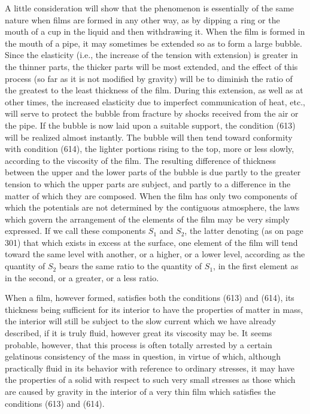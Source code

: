 \documentclass[12pt]{article}
\begin{document}
A little consideration will show that the phenomenon is essentially of the same nature when films are formed in any other way, as by dipping a ring or the mouth of a cup in the liquid and then withdrawing it. When the film is formed in the mouth of a pipe, it may sometimes be extended so as to form a large bubble. Since the elasticity (i.e., the increase of the tension with extension) is greater in the thinner parts, the thicker parts will be most extended, and the effect of this process (so far as it is not modified by gravity) will be to diminish the ratio of the greatest to the least thickness of the film. During this extension, as well as at other times, the increased elasticity due to imperfect communication of heat, etc., will serve to protect the bubble from fracture by shocks received from the air or the pipe. If the bubble is now laid upon a suitable support, the condition (613) will be realized almost instantly. The bubble will then tend toward conformity with condition (614), the lighter portions rising to the top, more or less slowly, according to the viscosity of the film. The resulting difference of thickness between the upper and the lower parts of the bubble is due partly to the greater tension to which the upper parts are subject, and partly to a difference in the matter of which they are composed. When the film has only two components of which the potentials are not determined by the contiguous atmosphere, the laws which govern the arrangement of the elements of the film may be very simply expressed. If we call these components $S_1$ and $S_2$, the latter denoting (as on page 301) that which exists in excess at the surface, one element of the film will tend toward the same level with another, or a higher, or a lower level, according as the quantity of $S_2$ bears the same ratio to the quantity of $S_1$, in the first element as in the second, or a greater, or a less ratio. 

When a film, however formed, satisfies both the conditions (613) and (614), its thickness being sufficient for its interior to have the properties of matter in mass, the interior will still be subject to the slow current which we have already described, if it is truly fluid, however great its viscosity may be. It seems probable, however, that this process is often totally arrested by a certain gelatinous consistency of the mass in question, in virtue of which, although practically fluid in its behavior with reference to ordinary stresses, it may have the properties of a solid with respect to such very small stresses as those which are caused by gravity in the interior of a very thin film which satisfies the conditions (613) and (614).
\end{document}
